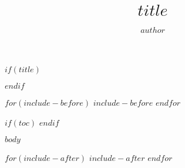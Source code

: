 \documentclass[10.5pt]{article}
\title{$title$}
\author{$author$}
\begin{document}
\begin{spacing}{1.2}

$if(title)$
    \maketitle
    \clearpage
$endif$

$for(include-before)$
    $include-before$
$endfor$

$if(toc)$
    \tableofcontents
    \clearpage
$endif$

$body$

$for(include-after)$
    $include-after$
$endfor$

\end{spacing}
\end{document}
